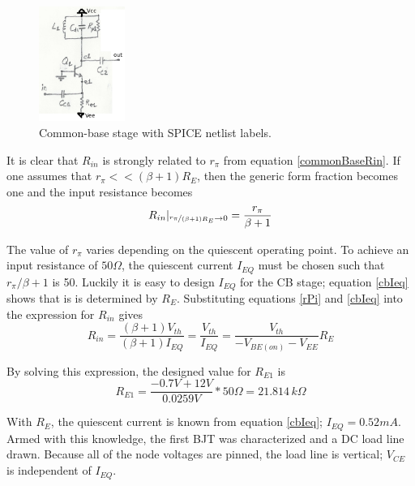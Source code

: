 \documentclass[titlepage, letterpaper, 11pt]{article}
\begin{document}
\begin{figure}[ht]
	\centering
	\includegraphics[width=0.25\textwidth]
		{figures/commonBaseStage}
	\caption{
		Common-base stage with SPICE netlist labels.
	}
	\label{commonBaseStage}
\end{figure}


It is clear that $R_{in}$ is strongly related to $r_{\pi}$ from
equation \ref{commonBaseRin}. If one assumes that
$r_{\pi}<<(\beta+1)R_{E}$, then the generic form fraction becomes one
and the input resistance becomes
\begin{equation*}
R_{in}|_{\nicefrac{r_{\pi}}{(\beta+1)R_{E}}\rightarrow 0}
=\frac{r_{\pi}}{\beta+1}
\end{equation*}

The value of $r_{\pi}$ varies depending on the quiescent operating
point. To achieve an input resistance of $50\Omega$, the quiescent
current $I_{EQ}$ must be chosen such that $r_{\pi}/\beta+1$ is 50.
Luckily it is easy to design $I_{EQ}$ for the CB stage; equation
\ref{cbIeq} shows that is is determined by $R_{E}$. Substituting
equations \ref{rPi} and \ref{cbIeq} into the expression for $R_{in}$
gives
\begin{equation*}
R_{in}=\frac{(\beta+1)V_{th}}{(\beta+1)I_{EQ}}=
\frac{V_{th}}{I_{EQ}}=
\frac{V_{th}}{-V_{BE(on)}-V_{EE}}R_{E}
\end{equation*}

By solving this expression, the designed value for $R_{E1}$ is
\begin{equation*}
R_{E1}=\frac{-0.7V+12V}{0.0259V}*50\Omega=21.814\,k\Omega
\end{equation*}

With $R_{E}$, the quiescent current is known from equation
\ref{cbIeq}; $I_{EQ}=0.52mA$. Armed with this knowledge, the first
BJT was characterized and a DC load line drawn. Because all of the
node voltages are pinned, the load line is vertical; $V_{CE}$ is 
independent of $I_{EQ}$.
\end{document}
